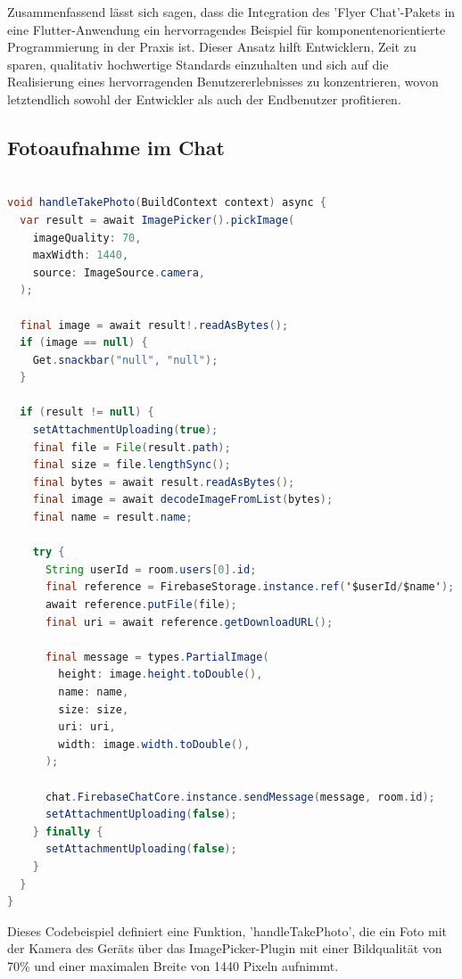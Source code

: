 Zusammenfassend lässt sich sagen, dass die Integration des 'Flyer Chat'-Pakets in eine Flutter-Anwendung ein hervorragendes Beispiel für komponentenorientierte Programmierung in der Praxis ist. Dieser Ansatz hilft Entwicklern, Zeit zu sparen, qualitativ hochwertige Standards einzuhalten und sich auf die Realisierung eines hervorragenden Benutzererlebnisses zu konzentrieren, wovon letztendlich sowohl der Entwickler als auch der Endbenutzer profitieren.

\subsection{Fotoaufnahme im Chat}

\begin{lstlisting}[language=Java,caption=Aufnahmeprozess für ein Foto,label=lst:foto]  

void handleTakePhoto(BuildContext context) async {
  var result = await ImagePicker().pickImage(
    imageQuality: 70,
    maxWidth: 1440,
    source: ImageSource.camera,
  );

  final image = await result!.readAsBytes();
  if (image == null) {
    Get.snackbar("null", "null");
  }

  if (result != null) {
    setAttachmentUploading(true);
    final file = File(result.path);
    final size = file.lengthSync();
    final bytes = await result.readAsBytes();
    final image = await decodeImageFromList(bytes);
    final name = result.name;

    try {
      String userId = room.users[0].id;
      final reference = FirebaseStorage.instance.ref('$userId/$name');
      await reference.putFile(file);
      final uri = await reference.getDownloadURL();

      final message = types.PartialImage(
        height: image.height.toDouble(),
        name: name,
        size: size,
        uri: uri,
        width: image.width.toDouble(),
      );

      chat.FirebaseChatCore.instance.sendMessage(message, room.id);
      setAttachmentUploading(false);
    } finally {
      setAttachmentUploading(false);
    }
  }
}

\end{lstlisting}

Dieses Codebeispiel definiert eine Funktion, 'handleTakePhoto', die ein Foto mit der Kamera des Geräts über das ImagePicker-Plugin mit einer Bildqualität von 70\% und einer maximalen Breite von 1440 Pixeln aufnimmt.

